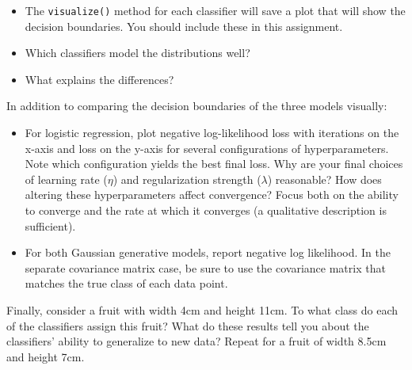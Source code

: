 \documentclass[submit]{harvardml}
\begin{document}
\begin{problem}
\begin{itemize}
\item The \texttt{visualize()} method for each classifier will save a plot that will show the decision boundaries. You should include these in this assignment.
\item Which classifiers model the distributions well?
\item What explains the differences?

\end{itemize}

In addition to comparing the decision boundaries of the three models visually:
\begin{itemize}

\item For logistic regression, plot negative log-likelihood loss with iterations on the x-axis and loss on the y-axis for several configurations of hyperparameters. Note which configuration yields the best final loss. Why are your final choices of learning rate ($\eta$) and regularization strength ($\lambda$) reasonable? How does altering these hyperparameters affect convergence? Focus both on the ability to converge and the rate at which it converges (a qualitative description is sufficient).

\item For both Gaussian generative models, report negative log likelihood. In the separate covariance matrix case, be sure to use the covariance matrix that matches the true class of each data point.

\end{itemize}

Finally, consider a fruit with width 4cm and height 11cm.  To what
class do each of the classifiers assign this fruit? What do these results tell you about the classifiers' ability to generalize to new data?  Repeat
for a fruit of width 8.5cm and height 7cm.

\end{problem}
\end{document}
